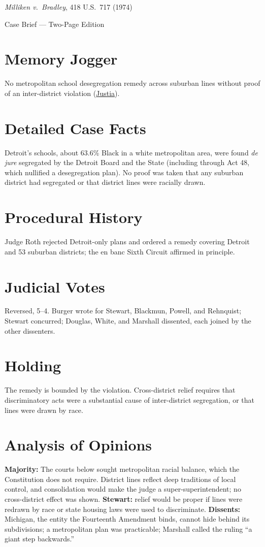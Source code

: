 \documentclass[12pt]{article}
\begin{document}
\begin{center}
{\LARGE \textit{Milliken v.\ Bradley}, 418 U.S.\ 717 (1974)\par}
\vspace{0.5em}
{\large Case Brief --- Two-Page Edition\par}
\end{center}

\section{Memory Jogger}
No metropolitan school desegregation remedy across suburban lines without proof of an inter-district violation (\href{https://supreme.justia.com/cases/federal/us/418/717/}{Justia}).

\section{Detailed Case Facts}
Detroit's schools, about 63.6\% Black in a white metropolitan area, were found \textit{de jure} segregated by the Detroit Board and the State (including through Act 48, which nullified a desegregation plan). No proof was taken that any suburban district had segregated or that district lines were racially drawn.

\section{Procedural History}
Judge Roth rejected Detroit-only plans and ordered a remedy covering Detroit and 53 suburban districts; the en banc Sixth Circuit affirmed in principle.

\section{Judicial Votes}
Reversed, 5--4. Burger wrote for Stewart, Blackmun, Powell, and Rehnquist; Stewart concurred; Douglas, White, and Marshall dissented, each joined by the other dissenters.

\section{Holding}
The remedy is bounded by the violation. Cross-district relief requires that discriminatory acts were a substantial cause of inter-district segregation, or that lines were drawn by race.

\section{Analysis of Opinions}
\textbf{Majority:} The courts below sought metropolitan racial balance, which the Constitution does not require. District lines reflect deep traditions of local control, and consolidation would make the judge a super-superintendent; no cross-district effect was shown. \textbf{Stewart:} relief would be proper if lines were redrawn by race or state housing laws were used to discriminate. \textbf{Dissents:} Michigan, the entity the Fourteenth Amendment binds, cannot hide behind its subdivisions; a metropolitan plan was practicable; Marshall called the ruling ``a giant step backwards.''
\end{document}
